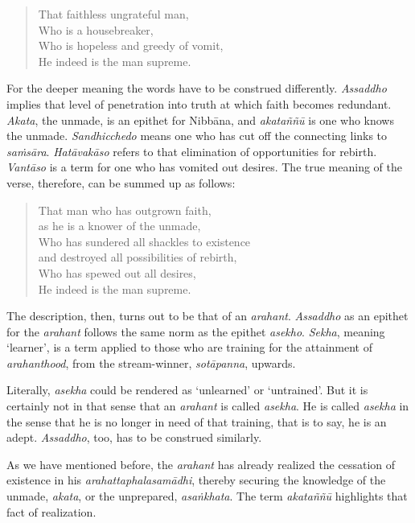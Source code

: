 \begin{quote}
That faithless ungrateful man,\\
Who is a housebreaker,\\
Who is hopeless and greedy of vomit,\\
He indeed is the man supreme.
\end{quote}

For the deeper meaning the words have to be construed differently. \emph{Assaddho} implies that level of penetration into truth at which faith becomes redundant. \emph{Akata}, the unmade, is an epithet for Nibbāna, and \emph{akataññū} is one who knows the unmade. \emph{Sandhicchedo} means one who has cut off the connecting links to \emph{saṁsāra}. \emph{Hatāvakāso} refers to that elimination of opportunities for rebirth. \emph{Vantāso} is a term for one who has vomited out desires. The true meaning of the verse, therefore, can be summed up as follows:

\enlargethispage{\baselineskip}

\begin{quote}
That man who has outgrown faith,\\
\vin as he is a knower of the unmade,\\
Who has sundered all shackles to existence\\
\vin and destroyed all possibilities of rebirth,\\
Who has spewed out all desires,\\
He indeed is the man supreme.
\end{quote}

The description, then, turns out to be that of an \emph{arahant}. \emph{Assaddho} as an epithet for the \emph{arahant} follows the same norm as the epithet \emph{asekho}. \emph{Sekha}, meaning `learner', is a term applied to those who are training for the attainment of \emph{arahanthood}, from the stream-winner, \emph{sotāpanna}, upwards.

Literally, \emph{asekha} could be rendered as `unlearned' or `untrained'. But it is certainly not in that sense that an \emph{arahant} is called \emph{asekha}. He is called \emph{asekha} in the sense that he is no longer in need of that training, that is to say, he is an adept. \emph{Assaddho}, too, has to be construed similarly.

As we have mentioned before, the \emph{arahant} has already realized the cessation of existence in his \emph{arahattaphalasamādhi}, thereby securing the knowledge of the unmade, \emph{akata}, or the unprepared, \emph{asaṅkhata}. The term \emph{akataññū} highlights that fact of realization.


